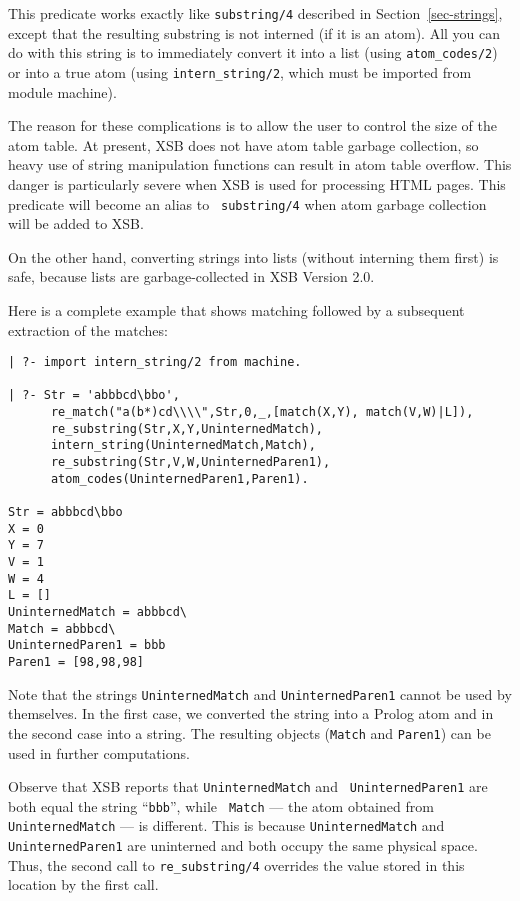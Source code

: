 This predicate works exactly like {\tt substring/4} described in
Section~\ref{sec-strings}, except that the resulting substring is
not interned (if it is an atom). All you can do with this
string is to immediately convert it into a list (using {\tt atom\_codes/2})
or into a true atom (using {\tt intern\_string/2}, which must be imported
from module machine).

The reason for these complications is to allow the user to control the size
of the atom table. At present, XSB does not have atom table garbage
collection, so heavy use of string manipulation functions can result in
atom table overflow. This danger is particularly severe when XSB is used
for processing HTML pages. This predicate will become an alias to {\tt
  substring/4} when atom garbage collection will be added to XSB.

On the other hand, converting strings into lists (without interning them
first) is safe, because lists are garbage-collected in XSB Version 2.0.

Here is a complete example that shows matching followed by a subsequent 
extraction of the matches:
\begin{verbatim}
| ?- import intern_string/2 from machine.

| ?- Str = 'abbbcd\bbo',
      re_match("a(b*)cd\\\\",Str,0,_,[match(X,Y), match(V,W)|L]),
      re_substring(Str,X,Y,UninternedMatch),
      intern_string(UninternedMatch,Match),
      re_substring(Str,V,W,UninternedParen1),
      atom_codes(UninternedParen1,Paren1).

Str = abbbcd\bbo
X = 0
Y = 7
V = 1
W = 4
L = []
UninternedMatch = abbbcd\
Match = abbbcd\
UninternedParen1 = bbb
Paren1 = [98,98,98]
\end{verbatim}
Note that the strings {\tt UninternedMatch} and {\tt UninternedParen1}
cannot be used by themselves. In the first case, we converted the string
into a Prolog atom and in the second case into a string. The resulting
objects ({\tt Match} and {\tt Paren1}) can be used in further computations.

Observe that XSB reports that {\tt UninternedMatch} and {\tt
UninternedParen1} are both equal the string ``{\tt bbb}'', while {\tt
Match} --- the atom obtained from {\tt UninternedMatch} --- is different.
This is because {\tt UninternedMatch} and {\tt UninternedParen1} are
uninterned and both occupy the same physical space. Thus, the second call
to \verb|re_substring/4| overrides the value stored in this location by the
first call.

